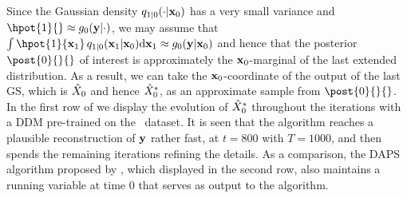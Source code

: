 Since the Gaussian density $\fw{1|0}{\bx_0}{\cdot}$ has a very small variance and $\hpot{1}{} \approx \pot{0}{}$, we may assume that $ \int \hpot{1}{\bx_1} \, \fw{1|0}{\bx_0}{\bx_1} \rmd \bx_1 \approx \pot{0}{\bx_0}$ and hence that the posterior $\post{0}{}{}$ of interest is approximately the $\mathbf{x}_0$-marginal of the last extended distribution. As a result, we can take the $\mathbf{x}_0$-coordinate of the output of the last GS, which is $\hat{X}_0$ and hence $\hat{X}^* _0$, as an approximate sample from $\post{0}{}{}$. In the first row of  we display the evolution of $\hat{X}^* _0$ throughout the iterations with a DDM pre-trained on the \ffhq\ dataset. It is seen that the algorithm reaches a plausible reconstruction of ${\mathbf{y}}$ rather fast, at $t = 800$ with $T = 1000$, and then spends the remaining iterations refining the details.  As a comparison, the DAPS algorithm proposed by \citet{zhang2024daps}, which displayed in the second row, also maintains a running variable at time $0$ that serves as output to the algorithm.

